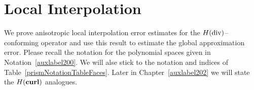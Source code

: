 \chapter{Local Interpolation}
We prove anisotropic local interpolation error estimates for the $H(\operatorname{\textrm{div}})$--conforming
operator
and use this result to estimate the global approximation error. Please recall 
the notation for the polynomial spaces given in Notation~\ref{auxlabel200}. We 
will alse stick to the notation and indices of Table~\ref{prismNotationTableFaces}.
Later in Chapter~\ref{auxlabel202} we will state the $H(\textbf{curl})$ analogues.




